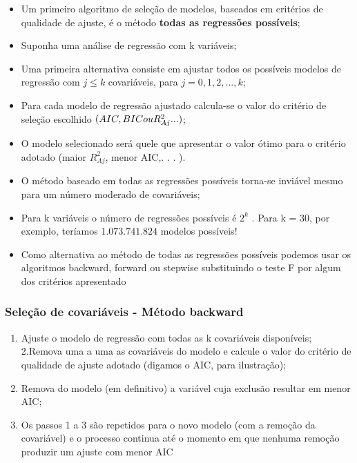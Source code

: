 \documentclass[
]{article}
\providecommand{\tightlist}{%
  \setlength{\itemsep}{0pt}\setlength{\parskip}{0pt}}
\begin{document}
{\begin{itemize}
\item
  Um primeiro algoritmo de seleção de modelos, baseados em critérios de
  qualidade de ajuste, é o método \textbf{todas as regressões
  possíveis};
\item
  Suponha uma análise de regressão com k variáveis;
\item
  Uma primeira alternativa consiste em ajustar todos os possíveis
  modelos de regressão com \(j \le k\) covariáveis, para
  \(j = 0, 1, 2, ..., k\);
\item
  Para cada modelo de regressão ajustado calcula-se o valor do critério
  de seleção escolhido \((AIC, BIC \space ou \space R_{Aj}^2 . . . )\);
\item
  O modelo selecionado será quele que apresentar o valor ótimo para o
  critério adotado (maior \(R_{Aj}^2\), menor AIC,. . . ).
\item
  O método baseado em todas as regressões possíveis torna-se inviável
  mesmo para um número moderado de covariáveis;
\item
  Para k variáveis o número de regressões possíveis é \(2^k\) . Para k =
  30, por exemplo, teríamos \(1.073.741.824\) modelos possíveis!
\item
  Como alternativa ao método de todas as regressões possíveis podemos
  usar os algoritmos backward, forward ou stepwise substituindo o teste
  F por algum dos critérios apresentado
\end{itemize}

\subsubsection{Seleção de covariáveis - Método
backward}\label{seleuxe7uxe3o-de-covariuxe1veis---muxe9todo-backward}

\begin{enumerate}
\def\labelenumi{\arabic{enumi}.}
\tightlist
\item
  Ajuste o modelo de regressão com todas as k covariáveis disponíveis;
  2.Remova uma a uma as covariáveis do modelo e calcule o valor do
  critério de qualidade de ajuste adotado (digamos o AIC, para
  ilustração);
\item
  Remova do modelo (em definitivo) a variável cuja exclusão resultar em
  menor AIC;
\item
  Os passos 1 a 3 são repetidos para o novo modelo (com a remoção da
  covariável) e o processo continua até o momento em que nenhuma remoção
  produzir um ajuste com menor AIC
\end{enumerate}

}
\end{document}
